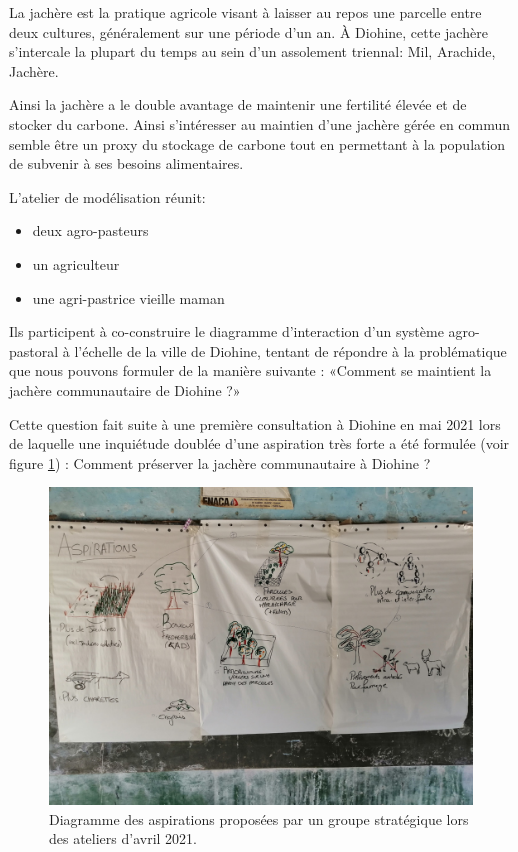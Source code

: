 La jachère est la pratique agricole visant à laisser au repos une parcelle entre deux cultures, généralement sur une période d'un an. À Diohine, cette jachère s'intercale la plupart du temps au sein d'un assolement triennal: Mil, Arachide, Jachère.

Ainsi la jachère a le double avantage de maintenir une fertilité élevée et de stocker du carbone. Ainsi s'intéresser au maintien d'une jachère gérée en commun semble être un proxy du stockage de carbone tout en permettant à la population de subvenir à ses besoins alimentaires.

L'atelier de modélisation réunit:
\begin{itemize}
  \item deux agro-pasteurs
  \item un agriculteur
  \item une agri-pastrice vieille maman
\end{itemize}

Ils participent à co-construire le diagramme d'interaction d'un système agro-pastoral à l'échelle de la ville de Diohine, tentant de répondre à la problématique que nous pouvons formuler de la manière suivante : «Comment se maintient la jachère communautaire de Diohine ?»

Cette question fait suite à une première consultation à Diohine en mai 2021 lors de laquelle une inquiétude doublée d'une aspiration très forte a été formulée (voir figure \ref{aspiration}) : Comment préserver la jachère communautaire à Diohine ?\cite{perrotton_definition_2021}


\begin{figure}[h!]
  \begin{center}
  \includegraphics[width=15cm]{img/aspiration_formulee.jpg}
  \end{center}
  \caption{Diagramme des aspirations proposées par un groupe stratégique lors des ateliers d'avril 2021.}
  \label{aspiration}
\end{figure}



